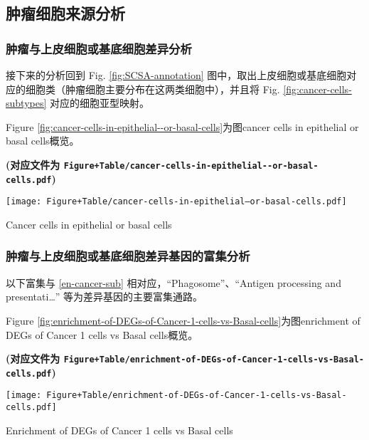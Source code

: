 \documentclass[
]{article}
\begin{document}
\hypertarget{ux80bfux7624ux7ec6ux80deux6765ux6e90ux5206ux6790}{%
\subsection{肿瘤细胞来源分析}\label{ux80bfux7624ux7ec6ux80deux6765ux6e90ux5206ux6790}}

\hypertarget{ux80bfux7624ux4e0eux4e0aux76aeux7ec6ux80deux6216ux57faux5e95ux7ec6ux80deux5deeux5f02ux5206ux6790}{%
\subsubsection{肿瘤与上皮细胞或基底细胞差异分析}\label{ux80bfux7624ux4e0eux4e0aux76aeux7ec6ux80deux6216ux57faux5e95ux7ec6ux80deux5deeux5f02ux5206ux6790}}

接下来的分析回到 Fig. \ref{fig:SCSA-annotation} 图中，取出上皮细胞或基底细胞对应的细胞类（肿瘤细胞主要分布在这两类细胞中），并且将 Fig. \ref{fig:cancer-cells-subtypes} 对应的细胞亚型映射。

Figure \ref{fig:cancer-cells-in-epithelial--or-basal-cells}为图cancer cells in epithelial or basal cells概览。

\textbf{(对应文件为 \texttt{Figure+Table/cancer-cells-in-epithelial-\/-or-basal-cells.pdf})}

\def\@captype{figure}
\begin{center}
\texttt{[image: Figure+Table/cancer-cells-in-epithelial--or-basal-cells.pdf]}
\caption{Cancer cells in epithelial  or basal cells}\label{fig:cancer-cells-in-epithelial--or-basal-cells}
\end{center}

\hypertarget{en-diff}{%
\subsubsection{肿瘤与上皮细胞或基底细胞差异基因的富集分析}\label{en-diff}}

以下富集与 \ref{en-cancer-sub} 相对应，``Phagosome''、``Antigen processing and presentati\ldots{}'' 等为差异基因的主要富集通路。

Figure \ref{fig:enrichment-of-DEGs-of-Cancer-1-cells-vs-Basal-cells}为图enrichment of DEGs of Cancer 1 cells vs Basal cells概览。

\textbf{(对应文件为 \texttt{Figure+Table/enrichment-of-DEGs-of-Cancer-1-cells-vs-Basal-cells.pdf})}

\def\@captype{figure}
\begin{center}
\texttt{[image: Figure+Table/enrichment-of-DEGs-of-Cancer-1-cells-vs-Basal-cells.pdf]}
\caption{Enrichment of DEGs of Cancer 1 cells vs Basal cells}\label{fig:enrichment-of-DEGs-of-Cancer-1-cells-vs-Basal-cells}
\end{center}
\end{document}
